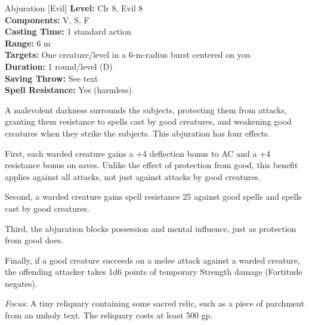 {Abjuration [Evil]}
{
	\textbf{Level:}
	Clr 8, Evil 8\\
	\textbf{Components:}
	V, S, F\\
	\textbf{Casting Time:}
	1 standard action\\
	\textbf{Range:}
	6 m\\
	\textbf{Targets:}
	One creature/level in a 6-m-radius burst centered on you\\
	\textbf{Duration:}
	1 round/level (D)\\
	\textbf{Saving Throw:}
	See text\\
	\textbf{Spell Resistance:}
	Yes (harmless)\\
}
{
	A malevolent darkness surrounds the subjects, protecting them from attacks, granting them resistance to spells cast by good creatures, and weakening good creatures when they strike the subjects. This abjuration has four effects.

	First, each warded creature gains a +4 deflection bonus to AC and a +4 resistance bonus on saves. Unlike the effect of protection from good, this benefit applies against all attacks, not just against attacks by good creatures.

	Second, a warded creature gains spell resistance 25 against good spells and spells cast by good creatures.

	Third, the abjuration blocks possession and mental influence, just as protection from good does.

	Finally, if a good creature succeeds on a melee attack against a warded creature, the offending attacker takes 1d6 points of temporary Strength damage (Fortitude negates).

	\textit{Focus}:
	A tiny reliquary containing some sacred relic, such as a piece of parchment from an unholy text. The reliquary costs at least 500 gp.

}
